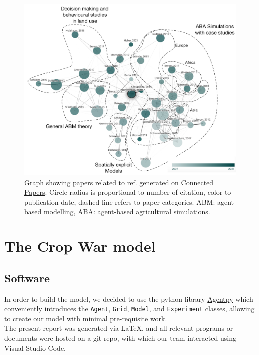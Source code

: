 \documentclass[a4paper,12pt]{article} %
\begin{document}
\begin{figure}[tb]
	\includegraphics[width=\textwidth]{Figures/StateOfTheArt2.pdf}
	\centering
	\caption{Graph showing papers related to ref. \cite{kremmydasReviewAgentBased2018} generated on \href{https://www.connectedpapers.com/main/35fac7b643317e5f48f5280fadec94051bf2401f/A-review-of-Agent-Based-Modeling-for-agricultural-policy-evaluation/graph}{Connected Papers}. Circle radius is proportional to number of citation, color to publication date, dashed line refers to paper categories. ABM: agent-based modelling, ABA: agent-based agricultural simulations.}
	\label{fig:State_of_the_art}
\end{figure}

\section{The Crop War model}

\subsection{Software}
In order to build the model, we decided to use the python library \href{https://agentpy.readthedocs.io/en/stable/overview.html}{Agentpy} which conveniently introduces the \texttt{Agent}, \texttt{Grid}, \texttt{Model}, and \texttt{Experiment} classes, allowing to create our model with minimal pre-requisite work.\\
The present report was generated via LaTeX, and all relevant programs or documents were hosted on a git repo, with which our team interacted using Visual Studio Code.
\end{document}
